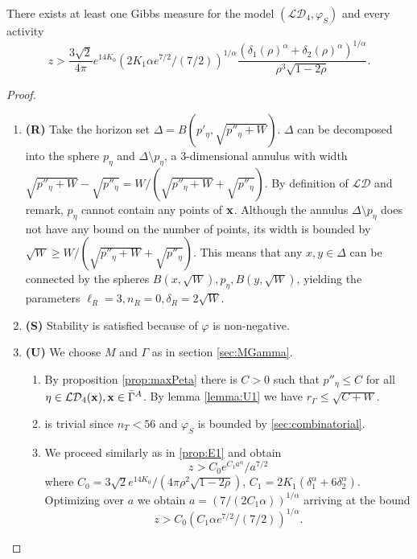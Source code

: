 \begin{proposition}\label{prop:E3}
	There exists at least one Gibbs measure for the model $(\mathcal {LD}_4,\varphi_S)$ and every activity 
	$$z> \frac{3\sqrt 2}{4\pi}e^{14 K_0}   (2K_1 \alpha e^{7/2}/(7/2))^{1/\alpha} \frac{(\delta_1(\rho)^\alpha + \delta_2(\rho)^\alpha)^{1/\alpha}}{\rho^3 \sqrt{1-2\rho}}.$$
\end{proposition}
\begin{proof}
\begin{enumerate}[]
	\item \textbf{(R)} Take the horizon set $\Delta = B(p'_\eta, \sqrt{p''_\eta + W})$. $\Delta$ can be decomposed into the sphere $p_\eta$ and $\Delta \setminus p_\eta$, a 3-dimensional annulus with width $\sqrt{p''_\eta+W} -\sqrt{p''_\eta}=W/(\sqrt{p''_\eta+W} + \sqrt{p''_\eta})$. By definition of $\mathcal {LD}$ and remark, $p_\eta$  cannot contain any points of ${\mathbf{x}}$.  Although the annulus $\Delta \setminus p_\eta$ does not have any bound on the number of points, its width is bounded by $\sqrt W \geq  W/(\sqrt{p''_\eta+W} + \sqrt{p''_\eta})$. This means that any $x,y\in \Delta$ can be connected by the spheres $B(x,\sqrt W), p_\eta, B(y,\sqrt W)$, yielding the parameters $\ell_R = 3,n_R=0,\delta_R=2\sqrt W$.
	\item \textbf{(S)} Stability is satisfied because of $\varphi$ is non-negative.
	\item \textbf{(U)} We choose $M$ and $\Gamma$ as in section \ref{sec:MGamma}.
		\begin{enumerate}[(U1)]
			\item By proposition \ref{prop:maxPeta} there is $C>0$ such that $p''_\eta\leq C$ for all $\eta \in \mathcal {LD}_4({\mathbf{x}}), {\mathbf{x}} \in \bar\Gamma^A$. By lemma \ref{lemma:U1} we have $r_\Gamma\leq \sqrt{C + W}$.
			\item is trivial since $n_T<56$ and $\varphi_{S}$ is bounded by \ref{sec:combinatorial}.
			\item We proceed similarly as in \ref{prop:E1} and obtain
				$$z>C_0 e^{C_1 a^\alpha} / a^{7/2}$$
				where $C_0=3 \sqrt 2 e^{14K_0} / (4\pi \rho^2 \sqrt{1-2\rho})$, $C_1 = 2K_1(\delta_1^\alpha + 6\delta_2^\alpha)$. Optimizing over $a$ we obtain $a=(7/(2C_1\alpha))^{1/\alpha}$ arriving at the bound
				$$z> C_0 (C_1 \alpha e^{7/2} / (7/2))^{1/\alpha}.$$
		\end{enumerate}
\end{enumerate}
\end{proof}



